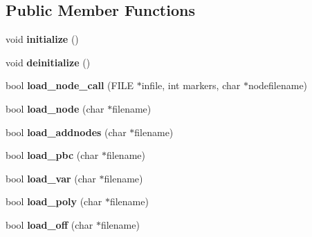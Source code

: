 \subsection*{Public Member Functions}
\begin{DoxyCompactItemize}
\item 
\mbox{\label{classStemMesh3D_1_1tetgenio_ac16e6ad18ce273e5641e77e43133ab34}} 
void {\bfseries initialize} ()
\item 
\mbox{\label{classStemMesh3D_1_1tetgenio_a50791238a7e9e271328b5c80cb48cced}} 
void {\bfseries deinitialize} ()
\item 
\mbox{\label{classStemMesh3D_1_1tetgenio_a1d2641699dddb6a716635f43de307586}} 
bool {\bfseries load\+\_\+node\+\_\+call} (F\+I\+LE $\ast$infile, int markers, char $\ast$nodefilename)
\item 
\mbox{\label{classStemMesh3D_1_1tetgenio_a329156308b8f67251fc4490dc8e6d983}} 
bool {\bfseries load\+\_\+node} (char $\ast$filename)
\item 
\mbox{\label{classStemMesh3D_1_1tetgenio_a1d6cd4aacd1fafe1f9522be663e503c4}} 
bool {\bfseries load\+\_\+addnodes} (char $\ast$filename)
\item 
\mbox{\label{classStemMesh3D_1_1tetgenio_a83442e24a49527ea42e7af8d1d800b33}} 
bool {\bfseries load\+\_\+pbc} (char $\ast$filename)
\item 
\mbox{\label{classStemMesh3D_1_1tetgenio_aa75ecd50869344069c8aab5bdd3b0e35}} 
bool {\bfseries load\+\_\+var} (char $\ast$filename)
\item 
\mbox{\label{classStemMesh3D_1_1tetgenio_a6eb2fe04559b4a56c574cd39c8e34439}} 
bool {\bfseries load\+\_\+poly} (char $\ast$filename)
\item 
\mbox{\label{classStemMesh3D_1_1tetgenio_aeaf98f93edbd2a9faa0d53ff4bc4e91b}} 
bool {\bfseries load\+\_\+off} (char $\ast$filename)
\item 

\end{DoxyCompactItemize}
